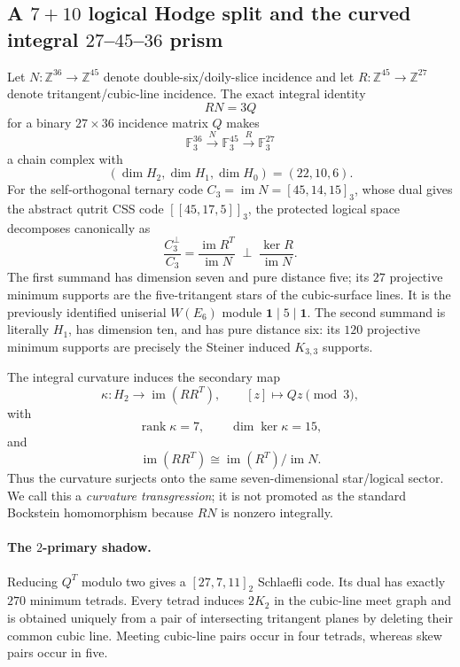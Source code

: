 \subsection{A $7+10$ logical Hodge split and the curved integral $27$--$45$--$36$ prism}

Let $N:\mathbb Z^{36}\to\mathbb Z^{45}$ denote double-six/doily-slice incidence
and let $R:\mathbb Z^{45}\to\mathbb Z^{27}$ denote tritangent/cubic-line
incidence.  The exact integral identity
\[
 RN=3Q
\]
for a binary $27\times36$ incidence matrix $Q$ makes
\[
 \mathbb F_3^{36}\xrightarrow{N}\mathbb F_3^{45}\xrightarrow{R}\mathbb F_3^{27}
\]
a chain complex with
\[
 \boxed{(\dim H_2,\dim H_1,\dim H_0)=(22,10,6)}.
\]
For the self-orthogonal ternary code $C_3=\operatorname{im}N=[45,14,15]_3$,
whose dual gives the abstract qutrit CSS code $[[45,17,5]]_3$, the protected
logical space decomposes canonically as
\[
 \boxed{
 \frac{C_3^\perp}{C_3}
 =
 \frac{\operatorname{im}R^T}{\operatorname{im}N}
 \;\perp\;
 \frac{\ker R}{\operatorname{im}N}.}
\]
The first summand has dimension seven and pure distance five; its $27$ projective
minimum supports are the five-tritangent stars of the cubic-surface lines.  It is
the previously identified uniserial $W(E_6)$ module $\mathbf1\mid5\mid\mathbf1$.
The second summand is literally $H_1$, has dimension ten, and has pure distance
six: its $120$ projective minimum supports are precisely the Steiner induced
$K_{3,3}$ supports.

The integral curvature induces the secondary map
\[
 \kappa:H_2\longrightarrow\operatorname{im}(RR^T),\qquad
 [z]\longmapsto Qz\pmod3,
\]
with
\[
 \boxed{\operatorname{rank}\kappa=7,\qquad\dim\ker\kappa=15},
\]
and
\[
 \operatorname{im}(RR^T)\cong\operatorname{im}(R^T)/\operatorname{im}N.
\]
Thus the curvature surjects onto the same seven-dimensional star/logical sector.
We call this a \emph{curvature transgression}; it is not promoted as the standard
Bockstein homomorphism because $RN$ is nonzero integrally.

\paragraph{The $2$-primary shadow.}
Reducing $Q^T$ modulo two gives a $[27,7,11]_2$ Schlaefli code.  Its dual has
exactly $270$ minimum tetrads.  Every tetrad induces $2K_2$ in the cubic-line meet
graph and is obtained uniquely from a pair of intersecting tritangent planes by
deleting their common cubic line.  Meeting cubic-line pairs occur in four tetrads,
whereas skew pairs occur in five.

